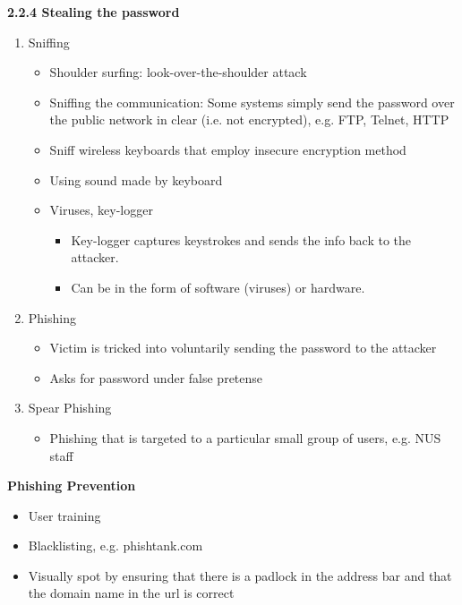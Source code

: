 \documentclass[landscape,a4paper]{extarticle}
\begin{document}
\begin{multicols*}{5}
    \textbf{2.2.4 Stealing the password}
    \begin{enumerate}
        \item Sniffing
        \begin{itemize}
            \item Shoulder surfing: look-over-the-shoulder attack
            \item Sniffing the communication: Some systems simply send the password over
            the public network in clear (i.e. not encrypted), e.g. FTP, Telnet, HTTP
            \item Sniff wireless keyboards that employ insecure encryption method
            \item Using sound made by keyboard
            \item Viruses, key-logger
            \begin{itemize}
                \item Key-logger captures keystrokes and sends the info back to the attacker.
                \item Can be in the form of software (viruses) or hardware.
            \end{itemize}
        \end{itemize}
        \item Phishing
        \begin{itemize}
            \item Victim is tricked into voluntarily sending the password to the attacker
            \item Asks for password under false pretense
        \end{itemize}
        \item Spear Phishing
        \begin{itemize}
            \item Phishing that is targeted to a particular small group of users, e.g. NUS staff
        \end{itemize}
    \end{enumerate}

    \textbf{Phishing Prevention}
    \begin{itemize}
        \item User training
        \item Blacklisting, e.g. phishtank.com
        \item Visually spot by ensuring that there is a padlock in the address bar and that the 
        domain name in the url is correct
    \end{itemize}


\end{multicols*}
\end{document}
